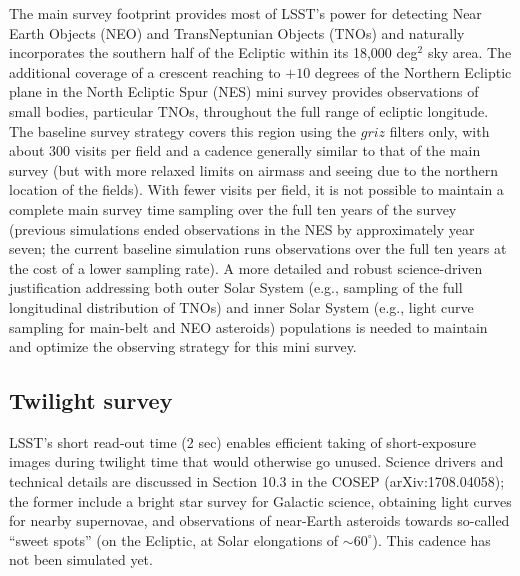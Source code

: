 \documentclass[DM,lsstdraft,toc,usenatbib]{lsstdoc}
\begin{document}
The main survey footprint provides most of LSST's power for detecting Near Earth Objects (NEO) and 
TransNeptunian Objects (TNOs) and naturally incorporates the southern half of the Ecliptic within its 
18,000 deg$^2$ sky area. The additional coverage of a crescent reaching to $+10$ degrees of the Northern Ecliptic 
plane in the North Ecliptic Spur (NES) mini survey provides observations of small bodies, particular TNOs, 
throughout the full range of ecliptic longitude. The baseline survey strategy covers this region using the 
$griz$ filters only, with about 300 visits per field and a cadence generally similar to that of the main survey
(but with more relaxed limits on airmass and seeing due to the northern location of the fields). With fewer visits per field,
it is not possible to maintain a complete main survey time sampling over the full ten years of the survey (previous
simulations ended observations in the NES by approximately year seven; the current baseline simulation runs 
observations over the full ten years at the cost of a lower sampling rate). 
A more detailed  and robust science-driven justification addressing both outer Solar System (e.g., sampling
of the full longitudinal distribution of TNOs) and inner Solar System (e.g., light curve sampling for main-belt 
and NEO asteroids) populations is needed to maintain and optimize the observing strategy for this
mini survey.  


\subsection{Twilight survey \label{sec:twilight}} 

LSST's short read-out time (2 sec) enables efficient taking of short-exposure images during twilight time 
that would otherwise go unused. Science drivers and technical details are discussed in Section 10.3 in the 
COSEP (arXiv:1708.04058); the former include a bright star survey for Galactic
science, obtaining light curves for nearby supernovae, and observations of near-Earth asteroids towards
so-called ``sweet spots'' (on the Ecliptic, at Solar elongations of $\sim60^\circ$). This cadence has not 
been simulated yet. 
\end{document}
